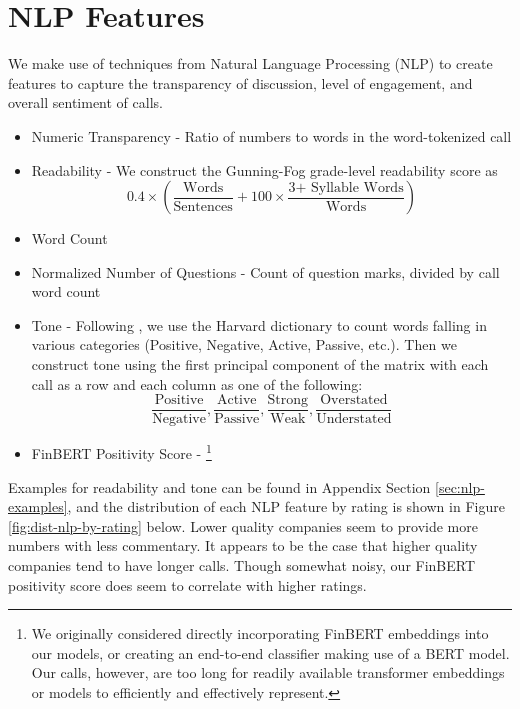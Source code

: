 \documentclass{article}[11pt]
\begin{document}
    \section*{NLP Features}

    We make use of techniques from Natural Language Processing (NLP) to create features to capture the transparency of discussion, level of engagement, and overall sentiment of calls.

    \begin{itemize}
        \item Numeric Transparency - Ratio of numbers to words in the word-tokenized call
        \item Readability - We construct the Gunning-Fog grade-level readability score \citep{gunning_technique_1952} as 
        \begin{equation*}
            0.4 \times (\frac{\text{Words}}{\text{Sentences}} + 100 \times \frac{\text{3+ Syllable Words}}{\text{Words}})
        \end{equation*}
        \item Word Count
        \item Normalized Number of Questions - Count of question marks, divided by call word count
        \item Tone - Following \cite{price_earnings_2012}, we use the Harvard dictionary to count words falling in various categories (Positive, Negative, Active, Passive, etc.). Then we construct tone using the first principal component of the matrix with each call as a row and each column as one of the following:
        \begin{equation*}
            \frac{\text{Positive}}{\text{Negative}}, \frac{\text{Active}}{\text{Passive}}, \frac{\text{Strong}}{\text{Weak}}, \frac{\text{Overstated}}{\text{Understated}}
        \end{equation*}
        \item FinBERT Positivity Score - \footnote{We originally considered directly incorporating FinBERT embeddings into our models, or creating an end-to-end classifier making use of a BERT model. Our calls, however, are too long for readily available transformer embeddings or models to efficiently and effectively represent.}
    \end{itemize}

    Examples for readability and tone can be found in Appendix Section \ref{sec:nlp-examples}, and the distribution of each NLP feature by rating is shown in Figure \ref{fig:dist-nlp-by-rating} below. Lower quality companies seem to provide more numbers with less commentary. It appears to be the case that higher quality companies tend to have longer calls. Though somewhat noisy, our FinBERT positivity score does seem to correlate with higher ratings.
\end{document}
